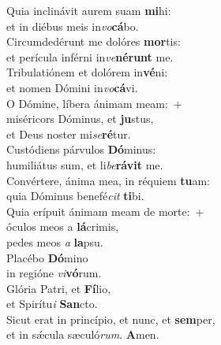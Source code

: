 \evenverse Quia inclinávit aurem suam \textbf{mi}hi:~\*\\
\evenverse et in diébus meis in\textit{vo}\textbf{cá}bo.\\
\oddverse Circumdedérunt me dolóres \textbf{mor}tis:~\*\\
\oddverse et perícula inférni in\textit{ve}\textbf{né}\textbf{runt} me.\\
\evenverse Tribulatiónem et dolórem in\textbf{vé}ni:~\*\\
\evenverse et nomen Dómini in\textit{vo}\textbf{cá}vi.\\
\oddverse O Dómine, líbera ánimam meam:~+\\
\oddverse  miséricors Dóminus, et \textbf{ju}stus,~\*\\
\oddverse et Deus noster mi\textit{se}\textbf{ré}tur.\\
\evenverse Custódiens párvulos \textbf{Dó}minus:~\*\\
\evenverse humiliátus sum, et li\textit{be}\textbf{rá}\textbf{vit} me.\\
\oddverse Convértere, ánima mea, in réquiem \textbf{tu}am:~\*\\
\oddverse quia Dóminus benefé\textit{cit} \textbf{ti}bi.\\
\evenverse Quia erípuit ánimam meam de morte:~+\\
\evenverse  óculos meos a \textbf{lá}crimis,~\*\\
\evenverse pedes meos \textit{a} \textbf{la}psu.\\
\oddverse Placébo \textbf{Dó}mino~\*\\
\oddverse in regióne \textit{vi}\textbf{vó}rum.\\
\evenverse Glória Patri, et \textbf{Fí}lio,~\*\\
\evenverse et Spirítu\textit{i} \textbf{San}cto.\\
\oddverse Sicut erat in princípio, et nunc, et \textbf{sem}per,~\*\\
\oddverse et in sǽcula sæculó\textit{rum}. \textbf{A}men.\\
